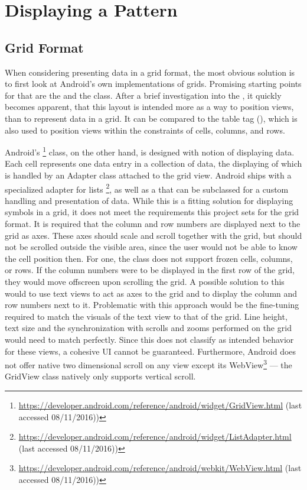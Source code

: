 \section{Displaying a Pattern}

\subsection{Grid Format}
\label{impl_grid_format}
When considering presenting data in a grid format, the most obvious solution is to first look at Android's own implementations of grids. Promising starting points for that are the  and the  class. After a brief investigation into the , it quickly becomes apparent, that this layout is intended more as a way to position views, than to represent data in a grid. It can be compared to the  table tag (\cite{android_tablelayout}), which is also used to position views within the constraints of cells, columns, and rows.

Android's \footnote{\url{https://developer.android.com/reference/android/widget/GridView.html} (last accessed 08/11/2016))} class, on the other hand, is designed with notion of displaying data. Each cell represents one data entry in a collection of data, the displaying of which is handled by an Adapter class attached to the grid view. Android ships with a specialized adapter for lists \footnote{\url{https://developer.android.com/reference/android/widget/ListAdapter.html} (last accessed 08/11/2016))}, as well as a  that can be subclassed for a custom handling and presentation of data. While this is a fitting solution for displaying symbols in a grid, it does not meet the requirements this project sets for the grid format. It is required that the column and row numbers are displayed next to the grid as axes. These axes should scale and scroll together with the grid, but should not be scrolled outside the visible area, since the user would not be able to know the cell position then. For one, the  class does not support frozen cells, columns, or rows. If the column numbers were to be displayed in the first row of the grid, they would move offscreen upon scrolling the grid. A possible solution to this would to use text views to act as axes to the grid and to display the column and row numbers next to it. Problematic with this approach would be the fine-tuning required to match the visuals of the text view to that of the grid. Line height, text size and the synchronization with scrolls and zooms performed on the grid would need to match perfectly. Since this does not classify as intended behavior for these views, a cohesive \gls{UI} cannot be guaranteed. Furthermore, Android does not offer native two dimensional scroll on any view except its WebView\footnote{\url{https://developer.android.com/reference/android/webkit/WebView.html} (last accessed 08/11/2016))} --- the GridView class natively only supports vertical scroll.

